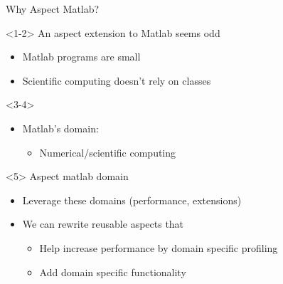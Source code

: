\begin{frame}{Why Aspect Matlab?}
  \begin{onlyenv}<1-2>
    An aspect extension to Matlab seems odd
    \begin{itemize}
    \item Matlab programs are small %
    \item Scientific computing doesn't rely on classes
    \end{itemize}
  \end{onlyenv}
  \begin{onlyenv}<3-4>
    \begin{itemize}
    \item Matlab's domain:
      \begin{itemize}
      \item Numerical/scientific computing
      \end{itemize}
    \end{itemize}
  \end{onlyenv}
  \begin{onlyenv}<5>
    Aspect matlab domain
    \begin{itemize}
    \item Leverage these domains (performance, extensions)
    \item We can rewrite reusable aspects that
      \begin{itemize}
      \item Help increase performance by domain specific profiling
      \item Add domain specific functionality
      \end{itemize}
    \end{itemize}
  \end{onlyenv}
\end{frame}


